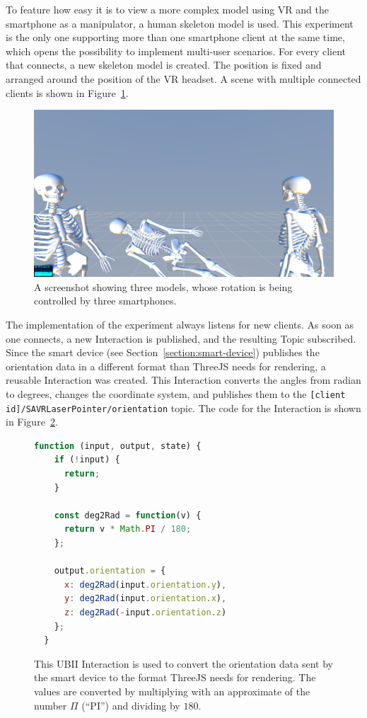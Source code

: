 To feature how easy it is to view a more complex model using \gls{VR} and the smartphone as a manipulator, a human skeleton model is used. This experiment is the only one supporting more than one smartphone client at the same time, which opens the possibility to implement multi-user scenarios. For every client that connects, a new skeleton model is created. The position is fixed and arranged around the position of the \gls{VR} headset. A scene with multiple connected clients is shown in Figure~\ref{fig:screenshot-exp-mv}.

\begin{figure}[H]
	\centering
	\includegraphics[width=12cm]{figures/implementation/screenshot_exp_mv.png}
	\caption[Screenshot of the model viewer]{A screenshot showing three models, whose rotation is being controlled by three smartphones.}\label{fig:screenshot-exp-mv}
\end{figure}

The implementation of the experiment always listens for new clients. As soon as one connects, a new Interaction is published, and the resulting Topic subscribed. Since the smart device (see Section~\ref{section:smart-device}) publishes the orientation data in a different format than ThreeJS needs for rendering, a reusable Interaction was created. This Interaction converts the angles from radian to degrees, changes the coordinate system, and publishes them to the \lstinline[breaklines=true]{[client id]/SAVRLaserPointer/orientation} topic. The code for the Interaction is shown in Figure~\ref{fig:ubii-interaction-angles}.

\begin{figure}[H]
	\begin{lstlisting}[language=JavaScript]
  function (input, output, state) {
    if (!input) {
      return;
    }

    const deg2Rad = function(v) {
      return v * Math.PI / 180;
    };

    output.orientation = {
      x: deg2Rad(input.orientation.y),
      y: deg2Rad(input.orientation.x),
      z: deg2Rad(-input.orientation.z)
    };
  }
 \end{lstlisting}
	\caption[A UBII Interaction of model viewer]{This \gls{UBII} Interaction is used to convert the orientation data sent by the smart device to the format ThreeJS needs for rendering. The values are converted by multiplying with an approximate of the number $\Pi$ (\enquote{PI}) and dividing by $180$.}\label{fig:ubii-interaction-angles} %
\end{figure}

